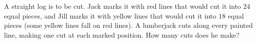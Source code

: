 A straight log is to be cut. Jack marks it with red lines that would cut it into $24$ equal pieces, and Jill marks it with yellow lines that would cut it into $18$ equal pieces (some yellow lines fall on red lines). A lumberjack cuts along every painted line, making one cut at each marked position. How many cuts does he make?
